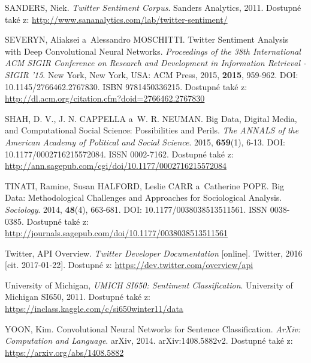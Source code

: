 \documentclass[12pt, a4paper]{article}
\numberwithin{equation}{section} 	%
\begin{document}
\begin{thebibliography}{99}
    SANDERS, Niek. \textit{Twitter Sentiment Corpus}. Sanders Analytics, 2011. Dostupné také z: \url{http://www.sananalytics.com/lab/twitter-sentiment/}

    SEVERYN, Aliaksei a~Alessandro MOSCHITTI. Twitter Sentiment Analysis with Deep Convolutional Neural Networks. \textit{Proceedings of the 38th International ACM SIGIR Conference on Research and Development in Information Retrieval - SIGIR '15}. New York, New York, USA: ACM Press, 2015, \textbf{2015}, 959-962. DOI: 10.1145/2766462.2767830. ISBN 9781450336215. Dostupné také z: \url{http://dl.acm.org/citation.cfm?doid=2766462.2767830}

    SHAH, D. V., J. N. CAPPELLA a~W. R. NEUMAN. Big Data, Digital Media, and Computational Social Science: Possibilities and Perils. \textit{The ANNALS of the American Academy of Political and Social Science}. 2015, \textbf{659}(1), 6-13. DOI: 10.1177/0002716215572084. ISSN 0002-7162. Dostupné také z: \url{http://ann.sagepub.com/cgi/doi/10.1177/0002716215572084}

    TINATI, Ramine, Susan HALFORD, Leslie CARR a~Catherine POPE. Big Data: Methodological Challenges and Approaches for Sociological Analysis. \textit{Sociology}. 2014, \textbf{48}(4), 663-681. DOI: 10.1177/0038038513511561. ISSN 0038-0385. Dostupné také z: \url{http://journals.sagepub.com/doi/10.1177/0038038513511561}

    Twitter, API Overview. \textit{Twitter Developer Documentation} [online]. Twitter, 2016 [cit. 2017-01-22]. Dostupné z: \url{https://dev.twitter.com/overview/api}

    University of Michigan, \textit{UMICH SI650: Sentiment Classification}. University of Michigan SI650, 2011. Dostupné také z: \url{https://inclass.kaggle.com/c/si650winter11/data}

    YOON, Kim. Convolutional Neural Networks for Sentence Classification. \textit{ArXiv: Computation and Language}. arXiv, 2014. arXiv:1408.5882v2. Dostupné také z: \url{https://arxiv.org/abs/1408.5882}

\end{thebibliography}
\end{document}
